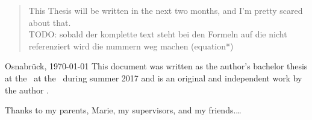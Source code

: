 \documentclass[11pt, oneside, english, singlespacing, %
headsepline, %
]{MastersDoctoralThesis}
\begin{document}
	
	\begin{abstract}
		\addchaptertocentry{\abstractname} %
		This Thesis will be written in the next two months, and I'm pretty scared about that.\\
		TODO: sobald der komplette text steht bei den Formeln auf die nicht referenziert wird die nummern weg machen (equation*)
	\end{abstract}


	\begin{preface}{\authorname}{Osnabrück, \today}
		\addchaptertocentry{\prefacename}
		\noindent This document was written as the author’s bachelor thesis at the \deptname~at the \univname~during summer 2017 and is an original and independent work by the author \authorname.
	\end{preface}



	
	
	\begin{acknowledgements}
		\addchaptertocentry{\acknowledgementname} %
		Thanks to my parents, Marie, my supervisors, and my friends.\ldots
	\end{acknowledgements}
	
	
	
%	
%	


	
\end{document}
